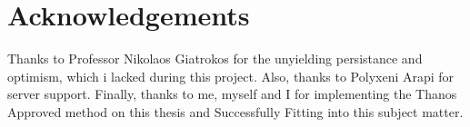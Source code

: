 \chapter*{Acknowledgements}

Thanks to Professor Nikolaos Giatrokos for the unyielding persistance and optimism, which i lacked during this project.
Also, thanks to Polyxeni Arapi for server support.
Finally, thanks to me, myself and I for implementing the Thanos Approved method on this thesis and Successfully Fitting into this subject matter. 
\clearpage